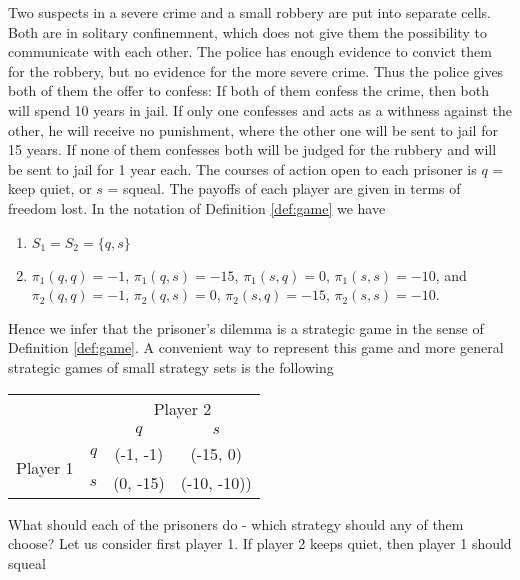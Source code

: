 \begin{example} 
    Two suspects in a severe crime and a small robbery are put into separate cells. Both are in solitary confinemnent, which does not give them the possibility
    to communicate with each other. The police has enough evidence to convict them for the robbery, but no evidence for the more severe crime. Thus the police
    gives both of them the offer to confess: If both of them confess the crime, then both will spend 10 years in jail. If only one confesses and acts as a
    withness against the other, he will receive no punishment, where the other one will be sent to jail for 15 years. If none of them confesses both will be judged
    for the rubbery and will be sent to jail for 1 year each. The courses of action open to each prisoner is $q$ = keep quiet, or $s$ = squeal. The payoffs of each 
    player are given in terms of freedom lost. In the notation of Definition \ref{def:game} we have
    \begin{enumerate}
        \item $S_{1} = S_{2} = \{q, s\}$
        \item $\pi_{1}(q, q) = -1$, $\pi_{1}(q, s) = -15$, $\pi_{1}(s, q) = 0$, $\pi_{1}(s, s) = -10$, and 
                $\pi_{2}(q, q) = -1$, $\pi_{2}(q, s) = 0$, $\pi_{2}(s, q) = -15$, $\pi_{2}(s, s) = -10$.
    \end{enumerate}
    Hence we infer that the prisoner's dilemma is a strategic game in the sense of Definition \ref{def:game}. A convenient way to represent this game and more general
    strategic games of small strategy sets is the following 
    \newline
    \begin{center}
        \begin{tabular}{c | r | c | c |}
            \multicolumn{2}{c}{} & \multicolumn{2}{c}{Player 2}\\
            \cline{2-4}
            & & $q$ & $s$ \\
            \cline{2-4}
            \multirow{2}{*}{Player 1} & $q$ & (-1, -1) & (-15, 0) \\
            \cline{2-4}
            & $s$ & (0, -15) & (-10, -10)) \\
            \cline{2-4}
        \end{tabular}            
    \end{center}
    What should each of the prisoners do - which strategy should any of them choose? Let us consider first player 1. If player 2 keeps quiet, then player 1 should squeal

\end{example}
